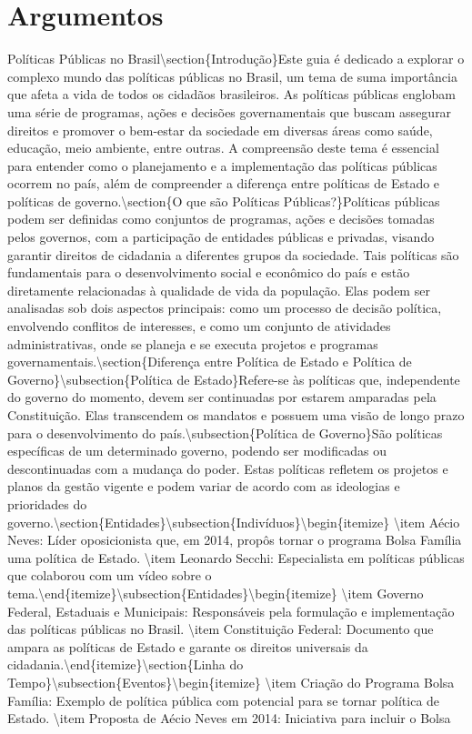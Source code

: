 \documentclass[
   article,       
   12pt,          
   oneside,       
   a4paper,       
   english,       
   brazil,        
   sumario=tradicional
   ]{abntex2}
\begin{document}
\section{Argumentos}
Políticas Públicas no Brasil\textbackslash{}section\{Introdução\}Este guia é dedicado a explorar o complexo mundo das políticas públicas no Brasil, um tema de suma importância que afeta a vida de todos os cidadãos brasileiros. As políticas públicas englobam uma série de programas, ações e decisões governamentais que buscam assegurar direitos e promover o bem-estar da sociedade em diversas áreas como saúde, educação, meio ambiente, entre outras. A compreensão deste tema é essencial para entender como o planejamento e a implementação das políticas públicas ocorrem no país, além de compreender a diferença entre políticas de Estado e políticas de governo.\textbackslash{}section\{O que são Políticas Públicas?\}Políticas públicas podem ser definidas como conjuntos de programas, ações e decisões tomadas pelos governos, com a participação de entidades públicas e privadas, visando garantir direitos de cidadania a diferentes grupos da sociedade. Tais políticas são fundamentais para o desenvolvimento social e econômico do país e estão diretamente relacionadas à qualidade de vida da população. Elas podem ser analisadas sob dois aspectos principais: como um processo de decisão política, envolvendo conflitos de interesses, e como um conjunto de atividades administrativas, onde se planeja e se executa projetos e programas governamentais.\textbackslash{}section\{Diferença entre Política de Estado e Política de Governo\}\textbackslash{}subsection\{Política de Estado\}Refere-se às políticas que, independente do governo do momento, devem ser continuadas por estarem amparadas pela Constituição. Elas transcendem os mandatos e possuem uma visão de longo prazo para o desenvolvimento do país.\textbackslash{}subsection\{Política de Governo\}São políticas específicas de um determinado governo, podendo ser modificadas ou descontinuadas com a mudança do poder. Estas políticas refletem os projetos e planos da gestão vigente e podem variar de acordo com as ideologias e prioridades do governo.\textbackslash{}section\{Entidades\}\textbackslash{}subsection\{Indivíduos\}\textbackslash{}begin\{itemize\}    \textbackslash{}item Aécio Neves: Líder oposicionista que, em 2014, propôs tornar o programa Bolsa Família uma política de Estado.    \textbackslash{}item Leonardo Secchi: Especialista em políticas públicas que colaborou com um vídeo sobre o tema.\textbackslash{}end\{itemize\}\textbackslash{}subsection\{Entidades\}\textbackslash{}begin\{itemize\}    \textbackslash{}item Governo Federal, Estaduais e Municipais: Responsáveis pela formulação e implementação das políticas públicas no Brasil.    \textbackslash{}item Constituição Federal: Documento que ampara as políticas de Estado e garante os direitos universais da cidadania.\textbackslash{}end\{itemize\}\textbackslash{}section\{Linha do Tempo\}\textbackslash{}subsection\{Eventos\}\textbackslash{}begin\{itemize\}    \textbackslash{}item Criação do Programa Bolsa Família: Exemplo de política pública com potencial para se tornar política de Estado.    \textbackslash{}item Proposta de Aécio Neves em 2014: Iniciativa para incluir o Bolsa 
\end{document}
